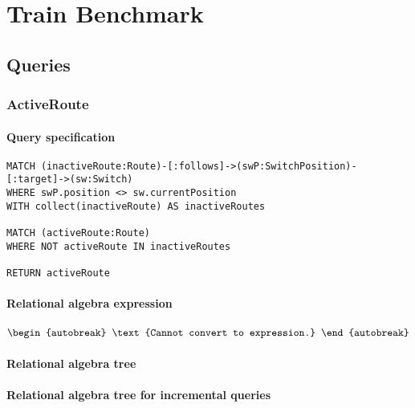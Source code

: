 \chapter{Train Benchmark}
\label{chp:trainbenchmark}

\section{Queries}

\subsection{ActiveRoute}

\subsubsection*{Query specification}

\begin{lstlisting}
MATCH (inactiveRoute:Route)-[:follows]->(swP:SwitchPosition)-[:target]->(sw:Switch)
WHERE swP.position <> sw.currentPosition
WITH collect(inactiveRoute) AS inactiveRoutes

MATCH (activeRoute:Route)
WHERE NOT activeRoute IN inactiveRoutes

RETURN activeRoute
\end{lstlisting}

\subsubsection*{Relational algebra expression}

\begin{align*}
\begin{autobreak}
\text{Cannot convert to expression.}
\end{autobreak}
\end{align*}

\subsubsection*{Relational algebra tree}


\subsubsection*{Relational algebra tree for incremental queries}

